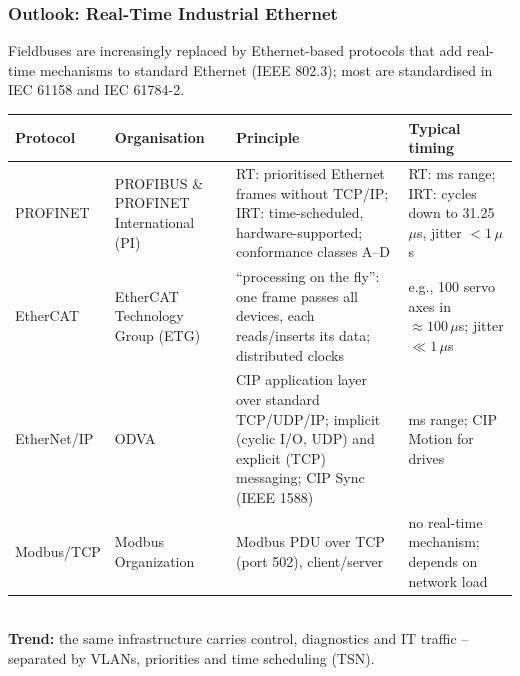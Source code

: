 \begin{frame}
	\frametitle{Outlook: Real-Time Industrial Ethernet}
	\footnotesize
	Fieldbuses are increasingly replaced by Ethernet-based protocols that add real-time mechanisms to standard Ethernet (IEEE 802.3); most are standardised in IEC 61158 and IEC 61784-2.\\[1mm]
	\setlength{\tabcolsep}{4pt}
	\begin{tabular}{@{}L{0.13\textwidth}L{0.17\textwidth}L{0.38\textwidth}L{0.27\textwidth}@{}}
		\toprule
		\textbf{Protocol} & \textbf{Organisation} & \textbf{Principle} & \textbf{Typical timing}\\
		\midrule
		PROFINET & PROFIBUS \& PROFINET International (PI) & RT: prioritised Ethernet frames without TCP/IP; IRT: time-scheduled, hardware-supported; conformance classes A--D & RT: ms range; IRT: cycles down to 31.25\,$\mu$s, jitter $< 1\,\mu$s\\
		EtherCAT & EtherCAT Technology Group (ETG) & ``processing on the fly'': one frame passes all devices, each reads/inserts its data; distributed clocks & e.g., 100 servo axes in $\approx 100\,\mu$s; jitter $\ll 1\,\mu$s\\
		EtherNet/IP & ODVA & CIP application layer over standard TCP/UDP/IP; implicit (cyclic I/O, UDP) and explicit (TCP) messaging; CIP Sync (IEEE 1588) & ms range; CIP Motion for drives\\
		Modbus/TCP & Modbus Organization & Modbus PDU over TCP (port 502), client/server & no real-time mechanism; depends on network load\\
		\bottomrule
	\end{tabular}\\[2mm]
	\textbf{Trend:} the same infrastructure carries control, diagnostics and IT traffic -- separated by VLANs, priorities and time scheduling (TSN).
\end{frame}

